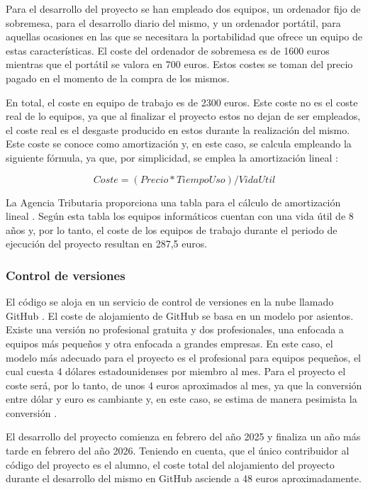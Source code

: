 Para el desarrollo del proyecto se han empleado dos equipos, un ordenador fijo de sobremesa, para el desarrollo diario del mismo, y un ordenador portátil, para aquellas ocasiones en las que se necesitara la portabilidad que ofrece un equipo de estas características. El coste del ordenador de sobremesa es de 1600 euros mientras que el portátil se valora en 700 euros. Estos costes se toman del precio pagado en el momento de la compra de los mismos.

En total, el coste en equipo de trabajo es de 2300 euros. Este coste no es el coste real de lo equipos, ya que al finalizar el proyecto estos no dejan de ser empleados, el coste real es el desgaste producido en estos durante la realización del mismo. Este coste se conoce como amortización y, en este caso, se calcula empleando la siguiente fórmula, ya que, por simplicidad, se emplea la amortización lineal \cite{amortizacion}:

\[Coste = (Precio * TiempoUso) / VidaUtil\]

La Agencia Tributaria proporciona una tabla para el cálculo de amortización lineal \cite{tabla_amortizacion}. Según esta tabla los equipos informáticos cuentan con una vida útil de 8 años y, por lo tanto, el coste de los equipos de trabajo durante el periodo de ejecución del proyecto resultan en 287,5 euros.

\subsubsection{Control de versiones}

El código se aloja en un servicio de control de versiones en la nube llamado GitHub \cite{github}. El coste de alojamiento de GitHub se basa en un modelo por asientos. Existe una versión no profesional gratuita y dos profesionales, una enfocada a equipos más pequeños y otra enfocada a grandes empresas. En este caso, el modelo más adecuado para el proyecto es el profesional para equipos pequeños, el cual cuesta 4 dólares estadounidenses por miembro al mes. Para el proyecto el coste será, por lo tanto, de unos 4 euros aproximados al mes, ya que la conversión entre dólar y euro es cambiante y, en este caso, se estima de manera pesimista la conversión \cite{github_pricing}.

El desarrollo del proyecto comienza en febrero del año 2025 y finaliza un año más tarde en febrero del año 2026. Teniendo en cuenta, que el único contribuidor al código del proyecto es el alumno, el coste total del alojamiento del proyecto durante el desarrollo del mismo en GitHub asciende a 48 euros aproximadamente.


